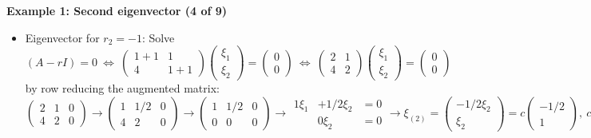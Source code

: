 \documentclass[11pt,a4paper]{article}
\begin{document}
	\textbf{Example 1: Second eigenvector (4 of 9)}
	\begin{itemize}
		\item Eigenvector for $r_2 = -1$: Solve
		$$
		(A-rI) = 0\ \Leftrightarrow\ 
		\begin{pmatrix}
			1+1 & 1\\
			4 & 1+1
		\end{pmatrix}
		\begin{pmatrix}
			\xi_1\\
			\xi_2
		\end{pmatrix}
		=
		\begin{pmatrix}
			0\\
			0
		\end{pmatrix}\ \Leftrightarrow\ 
		\begin{pmatrix}
			2 & 1\\
			4 & 2
		\end{pmatrix}
		\begin{pmatrix}
			\xi_1\\
			\xi_2
		\end{pmatrix}
		=
		\begin{pmatrix}
			0\\
			0
		\end{pmatrix}
		$$
		by row reducing the augmented matrix:\\
		$
		\begin{pmatrix}
			2 & 1 & 0\\
			4 & 2 & 0
		\end{pmatrix}\to
		\begin{pmatrix}
			1 & 1/2 & 0\\
			4 & 2 & 0
		\end{pmatrix}\to
		\begin{pmatrix}
			1 & 1/2 & 0\\
			0 & 0 & 0
		\end{pmatrix}\to
		\begin{matrix}
			1\xi_1 & +1/2\xi_2 & = 0\\
			& 0\xi_2 & = 0
		\end{matrix}\to
		\xi_{(2)}=
		\begin{pmatrix}
			-1/2\xi_2\\
			\xi_2
		\end{pmatrix} = c
		\begin{pmatrix}
			-1/2\\
			1
		\end{pmatrix},\ c\ \text{arbitrary $\to$ choose}\ \xi^{(2)} = 
		\begin{pmatrix}
			1\\
			-2
		\end{pmatrix}
		$
	\end{itemize}
\end{document}
